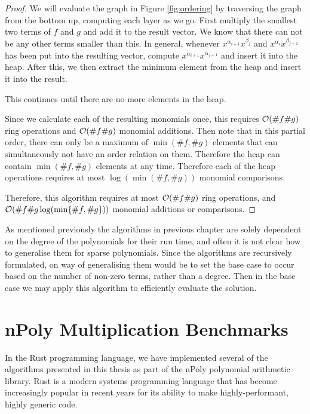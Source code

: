 \begin{proof}
    We will evaluate the graph in Figure \ref{fig:ordering} by traversing the graph from the bottom up, computing each layer as we go. 
    First multiply the smallest two terms of $f$ and $g$ and add it to the result vector. We know that there can not be any other terms smaller than this.
In general, whenever $x^{\alpha_{i+1}} x^{\beta_j}$ and $x^{\alpha_i} x^{\beta_{j+1}}$ has been put into the resulting vector, compute $x^{\alpha_{i+1}}x^{\alpha_{j+1}}$ and insert it into the heap. After this, we then extract the minimum element from the heap and insert it into the result.

    This continues until there are no more elements in the heap. 

    Since we calculate each of the resulting monomials once, this requires $\mathcal O(\# f \# g)$ ring operations and $\mathcal O(\# f \# g)$ monomial additions. Then note that in this partial order, there can only be a maximum of $\min(\# f, \# g)$ elements that can simultaneously not have an order relation on them. Therefore the heap can contain $\min(\# f, \# g)$ elements at any time. Therefore each of the heap operations requires at most $\log (\min(\# f, \# g))$ monomial comparisons.

    Therefore, this algorithm requires at most $\mathcal O(\# f \# g)$ ring operations, and $\mathcal O(\# f \# g \log ( \min \{\# f, \# g\}))$ monomial additions or comparisons.
    
\end{proof}

As mentioned previously the algorithms in previous chapter are solely dependent on the degree of the polynomials for their run time, and often it is not clear how to generalise them for sparse polynomials. Since the algorithms are recursively formulated, on way of generalising them would be to set the base case to occur based on the number of non-zero terms, rather than a degree. Then in the base case we may apply this algorithm to efficiently evaluate the solution.

\section{nPoly Multiplication Benchmarks}

In the Rust programming language, we have implemented several of the algorithms presented in this thesis as part of the nPoly polynomial arithmetic library. Rust is a modern systems programming language that has become increasingly popular in recent years for its ability to make highly-performant, highly generic code.

